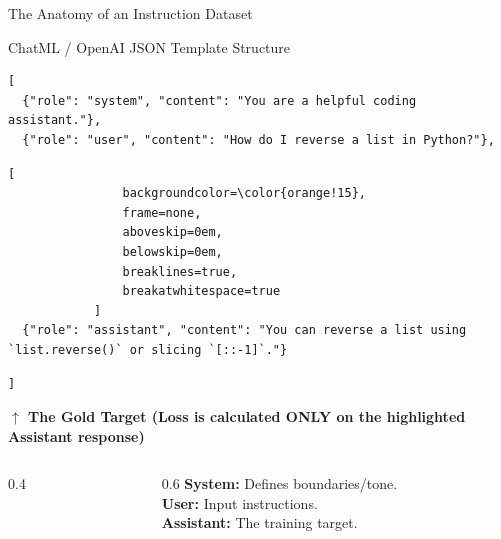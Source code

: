 \documentclass[10pt, aspectratio=169]{beamer}
\begin{document}
\begin{frame}[fragile]{The Anatomy of an Instruction Dataset}

	\begin{block}{ChatML / OpenAI JSON Template Structure}
		\begin{lstlisting}[belowskip=-0.8em]
[
  {"role": "system", "content": "You are a helpful coding assistant."},
  {"role": "user", "content": "How do I reverse a list in Python?"},
        \end{lstlisting}

		\vskip -0.2cm
		\begin{tcolorbox}[
				colback=orange!15,
				colframe=orange!15,
				arc=0mm,
				boxrule=0pt,
				left=0mm, right=5mm, top=0mm, bottom=1mm,
				grow to left by=0.1cm, grow to right by=0.1cm
			]
			\begin{lstlisting}[
                backgroundcolor=\color{orange!15}, 
                frame=none, 
                aboveskip=0em, 
                belowskip=0em, 
                breaklines=true, 
                breakatwhitespace=true
            ]
  {"role": "assistant", "content": "You can reverse a list using `list.reverse()` or slicing `[::-1]`."}
            \end{lstlisting}
		\end{tcolorbox}

		\vskip -0.2cm
		\begin{lstlisting}
]
        \end{lstlisting}
	\end{block}

	\vskip 0.1cm
	\begin{center}
		\color{orange!90!black}\footnotesize\bfseries
		$\uparrow$ The Gold Target (Loss is calculated ONLY on the highlighted Assistant response)
	\end{center}
	\vskip 0.1cm

	\begin{columns}[T]
		\begin{column}{0.4\textwidth}
			\centering
		\end{column}
		\begin{column}{0.6\textwidth}
			\small
			\textbf{System:} Defines boundaries/tone. \\
			\textbf{User:} Input instructions. \\
			\textbf{Assistant:} The training target.
		\end{column}
	\end{columns}
\end{frame}
\end{document}
